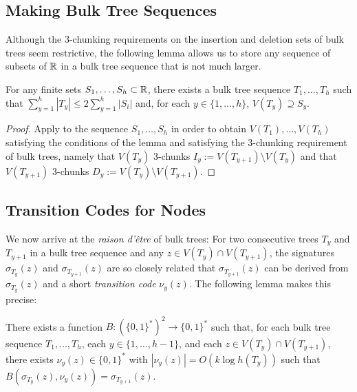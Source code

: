 \documentclass[kpfonts]{patmorin}
\let\le\leqslant
\begin{document}
\subsection{Making Bulk Tree Sequences}

Although the 3-chunking requirements on the insertion and deletion sets of bulk trees seem restrictive, the following lemma allows us to store any sequence of subsets of $\mathbb{R}$ in a bulk tree sequence that is not much larger.

\begin{lem}
  For any finite sets $S_1,\ldots,S_h\subset\mathbb{R}$, there exists a bulk tree sequence $T_1,\ldots,T_h$ such that $\sum_{y=1}^h |T_y|\le 2\sum_{y=1}^h |S_i|$ and, for each $y\in\{1,\ldots,h\}$, $V(T_y)\supseteq S_y$.
\end{lem}

\begin{proof}
  Apply  to the sequence $S_1,\ldots,S_h$ in order to obtain $V(T_1),\ldots,V(T_h)$ satisfying the conditions of the lemma and satisfying the 3-chunking requirement of bulk trees, namely that $V(T_y)$ 3-chunks $I_y:=V(T_{y+1})\setminus V(T_y)$ and that $V(T_{y+1})$ 3-chunks $D_y:=V(T_y)\setminus V(T_{y+1})$.
\end{proof}

\subsection{Transition Codes for Nodes}

We now arrive at the \emph{raison d'être} of bulk trees:  For two consecutive trees $T_y$ and $T_{y+1}$ in a bulk tree sequence and any $z\in V(T_y)\cap V(T_{y+1})$, the signatures $\sigma_{T_y}(z)$ and $\sigma_{T_{y+1}}(z)$ are so closely related that $\sigma_{T_{y+1}}(z)$ can be derived from $\sigma_{T_y}(z)$ and a short \emph{transition code} $\nu_y(z)$.  The following lemma makes this precise:

\begin{lem}
  There exists a function $B:(\{0,1\}^*)^2\to\{0,1\}^*$ such that, for each bulk tree sequence $T_1,\ldots,T_h$, each $y\in\{1,\ldots,h-1\}$, and each $z\in V(T_y)\cap V(T_{y+1})$, there exists $\nu_y(z)\in\{0,1\}^*$ with $|\nu_y(z)| = O(k\log h(T_y))$ such that $B(\sigma_{T_y}(z), \nu_y(z)) = \sigma_{T_{y+1}}(z)$.  
\end{lem}
\end{document}
